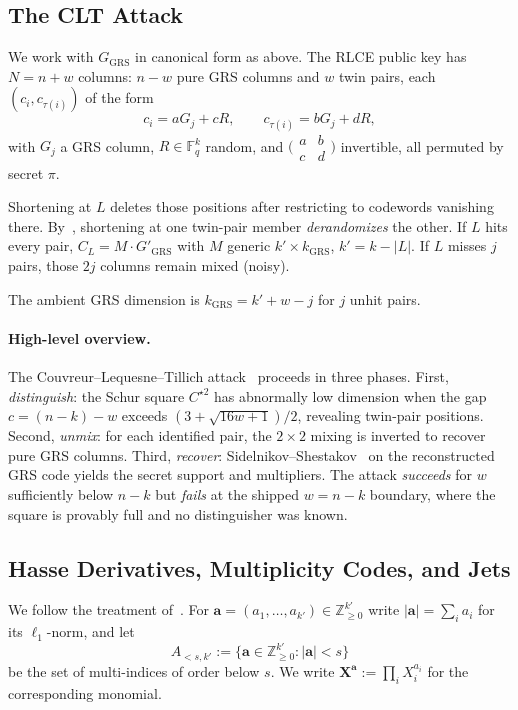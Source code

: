 \subsection{The CLT Attack}

We work with $G_{\mathrm{GRS}}$ in canonical form as above. The RLCE public key
has $N = n + w$ columns: $n - w$ pure GRS columns and $w$ twin pairs, each
$(c_i, c_{\tau(i)})$ of the form
\[
    c_i = a G_j + c R, \qquad c_{\tau(i)} = b G_j + d R,
\]
with $G_j$ a GRS column, $R \in \mathbb{F}_q^k$ random, and
$\bigl(\begin{smallmatrix}a&b\\c&d\end{smallmatrix}\bigr)$ invertible, all
permuted by secret $\pi$.

Shortening at $L$ deletes those positions after restricting to codewords
vanishing there. By~\cite[Lemma~24]{CLT18}, shortening at one twin-pair member
\emph{derandomizes} the other. If $L$ hits every pair, $C_L = M \cdot
    G'_{\mathrm{GRS}}$ with $M$ generic $k' \times k_{\mathrm{GRS}}$, $k' = k -
    |L|$. If $L$ misses $j$ pairs, those $2j$ columns remain mixed (noisy).

The ambient GRS dimension is $k_{\mathrm{GRS}} = k' + w - j$ for $j$ unhit
pairs.

\paragraph{High-level overview.} The Couvreur--Lequesne--Tillich
attack~\cite{CLT18} proceeds in three phases. First, \emph{distinguish}: the
Schur square $C^{\star 2}$ has abnormally low dimension when the gap $c = (n-k)
    - w$ exceeds $(3+\sqrt{16w+1})/2$, revealing twin-pair positions. Second,
\emph{unmix}: for each identified pair, the $2 \times 2$ mixing is inverted to
recover pure GRS columns. Third, \emph{recover}:
Sidelnikov--Shestakov~\cite{sidelnikov1992insecurity} on the
reconstructed GRS code yields the secret support and multipliers. The attack
\emph{succeeds} for $w$ sufficiently below $n-k$ but \emph{fails} at the
shipped $w = n-k$ boundary, where the square is provably full and no
distinguisher was known.

\subsection{Hasse Derivatives, Multiplicity Codes, and Jets}\label{sec:hasse}

We follow the treatment of~\cite{GIJS26}. For $\mathbf{a} = (a_1,\dots,a_{k'})
    \in \mathbb{Z}_{\geq 0}^{k'}$ write $|\mathbf{a}| = \sum_i a_i$ for its
$\ell_1$-norm, and let
\[
    A_{<s,k'} := \{\mathbf{a} \in \mathbb{Z}_{\geq 0}^{k'} : |\mathbf{a}| < s\}
\]
be the set of multi-indices of order below $s$.  We write
$\mathbf{X}^{\mathbf{a}} := \prod_i X_i^{a_i}$ for the corresponding monomial.

